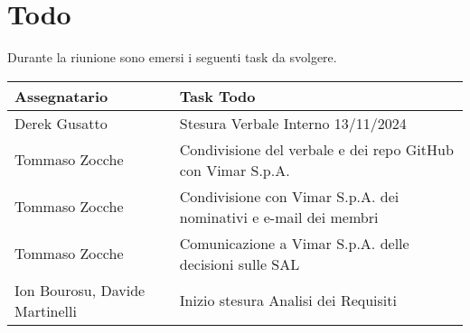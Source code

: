 \section{Todo}
Durante la riunione sono emersi i seguenti task da svolgere.

\begin{center}
  \begin{tabular}{|p{5cm}|p{8cm}|}
    \hline
    \textbf{Assegnatario}       & \textbf{Task Todo} \\ 
    \hline
    Derek Gusatto   &  Stesura Verbale Interno 13/11/2024\\ \hline
     Tommaso Zocche  & Condivisione del verbale e dei repo GitHub con Vimar S.p.A. \\ \hline
     Tommaso Zocche  & Condivisione con Vimar S.p.A. dei nominativi e e-mail dei membri \\ \hline
     Tommaso Zocche  & Comunicazione a Vimar S.p.A. delle decisioni sulle SAL \\ \hline
     Ion Bourosu, Davide Martinelli  & Inizio stesura Analisi dei Requisiti\\ \hline
  \end{tabular}
\end{center}